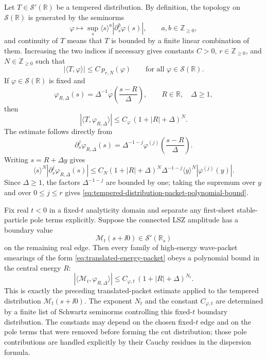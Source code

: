 Let \(T\in\mathcal S'(\mathbb R)\) be a tempered distribution.  By definition,
the topology on \(\mathcal S(\mathbb R)\) is generated by the seminorms
\[
  \varphi\mapsto
  \sup_s \langle s\rangle^a|\partial_s^b\varphi(s)|,
  \qquad a,b\in\mathbb Z_{\ge0},
\]
and continuity of \(T\) means that \(T\) is bounded by a finite linear
combination of them.  Increasing the two indices if necessary gives constants
\(C>0\), \(r\in\mathbb Z_{\ge0}\), and \(N\in\mathbb Z_{\ge0}\) such that
\begin{equation}
  |\langle T,\varphi\rangle|
  \le
  C\,p_{r,N}(\varphi)
  \qquad
  \text{for all }\varphi\in\mathcal S(\mathbb R).
  \label{eq:tempered-distribution-seminorm-bound}
\end{equation}
If \(\varphi\in\mathcal S(\mathbb R)\) is fixed and
\begin{equation}
  \varphi_{R,\Delta}(s)
  =
  \Delta^{-1}\varphi\!\left(\frac{s-R}{\Delta}\right),
  \qquad
  R\in\mathbb R,\quad \Delta\ge1,
  \label{eq:translated-energy-packet}
\end{equation}
then
\begin{equation}
  |\langle T,\varphi_{R,\Delta}\rangle|
  \le
  C_\varphi\,
  (1+|R|+\Delta)^N .
  \label{eq:tempered-distribution-packet-polynomial-bound}
\end{equation}
The estimate follows directly from
\[
  \partial_s^j\varphi_{R,\Delta}(s)
  =
  \Delta^{-1-j}
  \varphi^{(j)}\!\left(\frac{s-R}{\Delta}\right).
\]
Writing \(s=R+\Delta y\) gives
\[
  \langle s\rangle^N
  |\partial_s^j\varphi_{R,\Delta}(s)|
  \le
  C_N(1+|R|+\Delta)^N
  \Delta^{-1-j}
  \langle y\rangle^N|\varphi^{(j)}(y)| .
\]
Since \(\Delta\ge1\), the factors \(\Delta^{-1-j}\) are bounded by one; taking
the supremum over \(y\) and over \(0\le j\le r\) gives
\eqref{eq:tempered-distribution-packet-polynomial-bound}.

\begin{remark}
\label{rem:fixed-t-lsz-tempered-polynomial-smearing}
Fix real \(t<0\) in a fixed-\(t\) analyticity domain and separate any
first-sheet stable-particle pole terms explicitly.  Suppose the connected
LSZ amplitude has a boundary value
\[
  \mathcal M_t(s+\ii0)\in\mathcal S'(\mathbb R_s)
\]
on the remaining real edge.  Then every family of high-energy wave-packet
smearings of the form \eqref{eq:translated-energy-packet} obeys a polynomial
bound in the central energy \(R\):
\begin{equation}
  |\langle\mathcal M_t,\varphi_{R,\Delta}\rangle|
  \le
  C_{\varphi,t}\,(1+|R|+\Delta)^{N_t}.
  \label{eq:fixed-t-lsz-smeared-polynomial-bound}
\end{equation}
This is exactly the preceding translated-packet estimate applied to the
tempered distribution \(\mathcal M_t(s+\ii0)\).  The exponent \(N_t\) and the
constant \(C_{\varphi,t}\) are determined by a finite list of Schwartz
seminorms controlling this fixed-\(t\) boundary distribution.  The constants
may depend on the chosen fixed-\(t\) edge and on the pole terms that were
removed before forming the cut distribution; those pole contributions are
handled explicitly by their Cauchy residues in the dispersion formula.
\end{remark}

